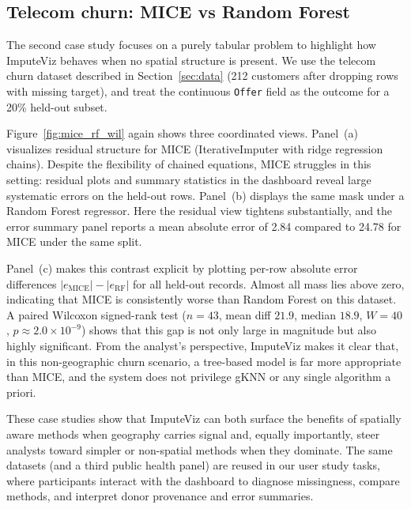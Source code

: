 \documentclass{egpubl}
\begin{document}
\vspace{-6pt}
\subsection{Telecom churn: MICE vs Random Forest}
\label{subsec:case-telecom}

The second case study focuses on a purely tabular problem to highlight how ImputeViz behaves when no spatial structure is present. We use the telecom churn dataset described in Section~\ref{sec:data} (212 customers after dropping rows with missing target), and treat the continuous \texttt{Offer} field as the outcome for a 20\% held-out subset.

Figure~\ref{fig:mice_rf_wil} again shows three coordinated views. Panel~(a) visualizes residual structure for MICE (IterativeImputer with ridge regression chains). Despite the flexibility of chained equations, MICE struggles in this setting: residual plots and summary statistics in the dashboard reveal large systematic errors on the held-out rows. Panel~(b) displays the same mask under a Random Forest regressor. Here the residual view tightens substantially, and the error summary panel reports a mean absolute error of 2.84 compared to 24.78 for MICE under the same split.

Panel~(c) makes this contrast explicit by plotting per-row absolute error differences $|e_\text{MICE}| - |e_\text{RF}|$ for all held-out records. Almost all mass lies above zero, indicating that MICE is consistently worse than Random Forest on this dataset. A paired Wilcoxon signed-rank test ($n = 43$, mean diff $21.9$, median $18.9$, $W = 40$, $p \approx 2.0\times 10^{-9}$) shows that this gap is not only large in magnitude but also highly significant. From the analyst’s perspective, ImputeViz makes it clear that, in this non-geographic churn scenario, a tree-based model is far more appropriate than MICE, and the system does not privilege gKNN or any single algorithm a priori.


These case studies show that ImputeViz can both surface the benefits of spatially aware methods when geography carries signal and, equally importantly, steer analysts toward simpler or non-spatial methods when they dominate. The same datasets (and a third public health panel) are reused in our user study tasks, where participants interact with the dashboard to diagnose missingness, compare methods, and interpret donor provenance and error summaries.
\end{document}
